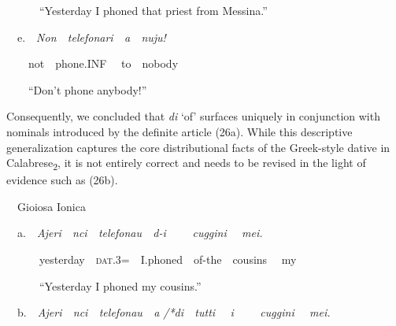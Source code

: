 \documentclass[output=paper,modfonts,nonflat]{langsci/langscibook}
\begin{document}
\begin{styleStandard}
\ \ \ \ \ \ “Yesterday I phoned that priest from Messina.”
\end{styleStandard}

\begin{styleStandard}
\ \ e.\ \ \textit{Non\ \ telefonari\ \ a\ \ nuju!}\ \ 
\end{styleStandard}

\begin{styleStandard}
\ \ \ \ not\ \ phone.INF \ \ to\ \ nobody
\end{styleStandard}

\begin{styleStandard}
\ \ \ \ “Don’t phone anybody!”
\end{styleStandard}

\begin{styleStandard}
Consequently, we concluded that \textit{di }‘of’ surfaces uniquely in conjunction with nominals introduced by the definite article (26a). While this descriptive generalization captures the core distributional facts of the Greek-style dative in Calabrese\textsubscript{2}, it is not entirely correct and needs to be revised in the light of evidence such as (26b).
\end{styleStandard}

\begin{listWWNumviiileveli}
\item 
\begin{styleListParagraph}
\ \ Gioiosa Ionica
\end{styleListParagraph}
\end{listWWNumviiileveli}
\begin{styleListParagraph}
\ \ a.\ \ \textit{Ajeri\ \ nci\ \ telefonau\ \ d-i \ \ \ \ cuggini \ \ mei.}
\end{styleListParagraph}

\begin{styleStandard}
\ \ \ \ \ \ yesterday\ \ \textsc{dat}.3=\ \ I.phoned\ \ of-the\ \ cousins \ \ my
\end{styleStandard}

\begin{styleStandard}
\ \ \ \ \ \ “Yesterday I phoned my cousins.”
\end{styleStandard}

\begin{styleStandard}
\ \ b.\ \ \textit{Ajeri\ \ nci\ \ telefonau\ \ a /*di\ \ tutti \ \ i \ \ \ \ cuggini \ \ mei.}
\end{styleStandard}
\end{document}
